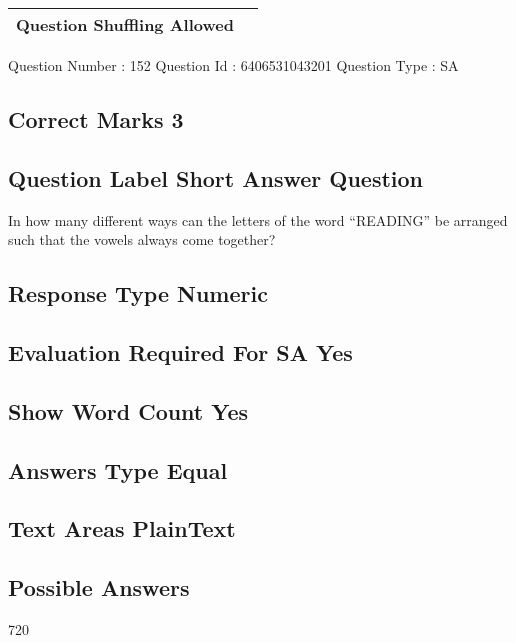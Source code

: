 \documentclass{article}
\begin{document}
\begin{longtable}{|c|c|}
\hline
\textbf{Question Shuffling Allowed} & \textbf{} \\ \hline
\end{longtable}

Question Number : 152 Question Id : 6406531043201 Question Type : SA\\

\subsection{Correct Marks  3}

\subsection{Question Label  Short Answer Question}

In how many different ways can the letters of the word “READING” be arranged such that the 
vowels always come together?\\

\subsection{Response Type  Numeric}

\subsection{Evaluation Required For SA  Yes}

\subsection{Show Word Count  Yes}

\subsection{Answers Type  Equal}

\subsection{Text Areas  PlainText}

\subsection{Possible Answers }

720\\
\end{document}
